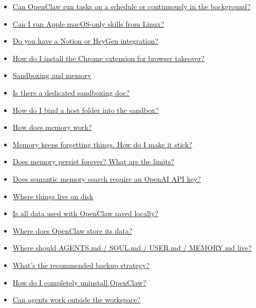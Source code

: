 \begin{itemize}
  \item \href{\#can-openclaw-run-tasks-on-a-schedule-or-continuously-in-the-background}{Can OpenClaw run tasks on a schedule or continuously in the background?}
  \item \href{\#can-i-run-apple-macos-only-skills-from-linux}{Can I run Apple macOS-only skills from Linux?}
  \item \href{\#do-you-have-a-notion-or-heygen-integration}{Do you have a Notion or HeyGen integration?}
  \item \href{\#how-do-i-install-the-chrome-extension-for-browser-takeover}{How do I install the Chrome extension for browser takeover?}
  \item \href{\#sandboxing-and-memory}{Sandboxing and memory}
  \item \href{\#is-there-a-dedicated-sandboxing-doc}{Is there a dedicated sandboxing doc?}
  \item \href{\#how-do-i-bind-a-host-folder-into-the-sandbox}{How do I bind a host folder into the sandbox?}
  \item \href{\#how-does-memory-work}{How does memory work?}
  \item \href{\#memory-keeps-forgetting-things-how-do-i-make-it-stick}{Memory keeps forgetting things. How do I make it stick?}
  \item \href{\#does-memory-persist-forever-what-are-the-limits}{Does memory persist forever? What are the limits?}
  \item \href{\#does-semantic-memory-search-require-an-openai-api-key}{Does semantic memory search require an OpenAI API key?}
  \item \href{\#where-things-live-on-disk}{Where things live on disk}
  \item \href{\#is-all-data-used-with-openclaw-saved-locally}{Is all data used with OpenClaw saved locally?}
  \item \href{\#where-does-openclaw-store-its-data}{Where does OpenClaw store its data?}
  \item \href{\#where-should-agentsmd-soulmd-usermd-memorymd-live}{Where should AGENTS.md / SOUL.md / USER.md / MEMORY.md live?}
  \item \href{\#whats-the-recommended-backup-strategy}{What's the recommended backup strategy?}
  \item \href{\#how-do-i-completely-uninstall-openclaw}{How do I completely uninstall OpenClaw?}
  \item \href{\#can-agents-work-outside-the-workspace}{Can agents work outside the workspace?}

\end{itemize}
